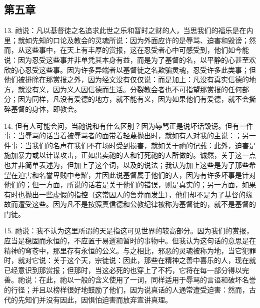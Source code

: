 
\subsection{第五章}

13. 祂说：凡以基督徒之名追求此世之乐和暂时之财的人，当思我们的福乐是在内里；就如先知的口论及教会的灵魂所说：因为外面应许的是辱骂、迫害和毁谤；然而，从这些事中，在天上有丰厚的赏报，这在忍受者心中可感受到，他们如今能说：因为忍受这些事并非单凭其本身有益，而是为了基督的名，以平静的心甚至欢欣的心忍受这些事。因为许多异端者以基督徒之名欺骗灵魂，忍受许多此类事；但他们被排除在那赏报之外，因为经文没有仅仅说：而是加上：凡没有真实信德的地方，就没有义，因为义人因信德而生活。分裂教会者也不可指望那赏报的任何部分；因为同样，凡没有爱德的地方，就不能有义，因为如果他们有爱德，就不会撕碎基督的身体，即教会。\par

14. 但有人可能会问，当祂说和有什么区别？因为辱骂正是说坏话毁谤。但有一件事：当辱骂的话当着被辱骂者的面带着轻蔑抛出时，就如有人对我的主说：；另一件事：当我们的名声在我们不在场时受到损害，就如关于祂的记载：此外，迫害是施加暴力或以计谋攻击，正如出卖祂的人和钉死祂的人所做的。诚然，关于这一点也并非简单表述为，但加上了这个词，以及的说法；我认为加上这些是为了那些希望在迫害和名誉卑贱中夸耀，并因此说基督属于他们的人，因为有许多坏事是针对他们的；但一方面，所说的话若是关于他们的错误，则是真实的；另一方面，如果有时也抛出一些虚假的指控（这常因人的鲁莽而发生），他们却不是为了基督的缘故而遭受这些。因为凡不是按照真信德和公教纪律被称为基督徒的，就不是基督的门徒。\par

15. 祂说：我不认为这里所谓的天是指这可见世界的较高部分。因为我们的赏报，应当是稳固而永恒的，不应置于易逝和暂时的事物中。但我认为这句话的意思是在精神的穹苍中，那里存有永恒的公义。与之相比，邪恶的灵魂被称为地，当它犯罪时，就对它说：关于这个天，宗徒说：因此，那些在精神之善中喜乐的人，现在就已经意识到那赏报；但那时，当这必死的也穿上了不朽，它将在每一部分得以完善。祂说：在此，祂以一般的含义使用了一词，同样适用于辱骂的言语和破坏名誉的行径；并且以榜样很好地鼓励了他们，因为说真话的人通常遭受迫害：然而，古代的先知们并没有因此，因惧怕迫害而放弃宣讲真理。\par

